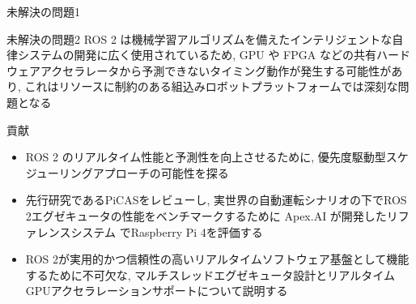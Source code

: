 
\begin{frame}{未解決の問題1}
\end{frame}

\begin{frame}{未解決の問題2}
    ROS 2 は機械学習アルゴリズムを備えたインテリジェントな自律システムの開発に広く使用されているため, GPU や FPGA などの共有ハードウェアアクセラレータから予測できないタイミング動作が発生する可能性があり, これはリソースに制約のある組込みロボットプラットフォームでは深刻な問題となる
\end{frame}

\begin{frame}{貢献}
    \begin{itemize}
        \item ROS 2 のリアルタイム性能と予測性を向上させるために, 優先度駆動型スケジューリングアプローチの可能性を探る
        \item 先行研究であるPiCASをレビューし, 実世界の自動運転シナリオの下でROS 2エグゼキュータの性能をベンチマークするために Apex.AI が開発したリファレンスシステム でRaspberry Pi 4を評価する
        \item ROS 2が実用的かつ信頼性の高いリアルタイムソフトウェア基盤として機能するために不可欠な, マルチスレッドエグゼキュータ設計とリアルタイムGPUアクセラレーションサポートについて説明する
    \end{itemize}
\end{frame}
